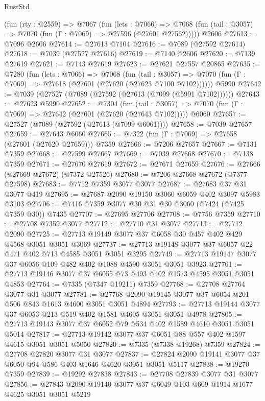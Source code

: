 \begin{lexlean}{RustStd}
\begin{coremodule}
    (fun (rty : @2559) =>
    @7067
      (fun (lets : @7066) =>
      @7068 (fun (tail : @3057) => @7070 (fun (Γ : @7069) => @27596 (@27601 @27562)))))
    @2606
@27613 := @7096 @2606
@27614 := @27613 @7104
@27616 := @7089 (@27592 @27614)
@27618 := @7039 (@27527 @27616)
@27619 := @7140 @2606
@27620 := @7139 @27619
@27621 := @7143 @27619
@27623 := @27621 @27557 @20865
@27635 := @7280
    (fun (lets : @7066) =>
    @7068
      (fun (tail : @3057) =>
      @7070 (fun (Γ : @7069) => @27618 (@27601 (@27620 (@27623 @7100 @7102))))))
    @5990
@27642 := @7039 (@27527 (@7089 (@27592 (@27613 (@7099 (@5991 @7102))))))
@27643 := @27623 @5990
@27652 := @7304
    (fun (tail : @3057) => @7070 (fun (Γ : @7069) => @27642 (@27601 (@27620 (@27643 @7102)))))
    @6060
@27657 := @27527 (@7089 (@27592 (@27613 (@7099 @6061))))
@27658 := @7039 @27657
@27659 := @27643 @6060
@27665 := @7322 (fun (Γ : @7069) => @27658 (@27601 (@27620 @27659))) @7359
@27666 := @7206 @27657
@27667 := @7131 @7359
@27668 := @27599 @27667
@27669 := @7039 @27668
@27670 := @7138 @7359
@27671 := @27670 @27619
@27672 := @27671 @27659
@27676 := @27666 (@27669 @27672) (@7372 @27526)
@27680 := @7206 @27668 @27672 (@7377 @27598)
@27683 := @7712 @7359 @3077 @3077
@27687 := @27683 @37 @31 @3077 @419
@27695 := @27687 @2090 @19150 @3060 @6059 @402 @3097 @5983 @3103
@27706 := @7416 @7359 @3077 @30 @31 @30 @3060 (@7424 (@7425 @7359 @30)) @7435
@27707 := @27695 @27706
@27708 := @7756 @7359
@27710 := @27708 @7359 @3077
@27712 := @27710 @31 @3077
@27713 := @27712 @2090
@27725 := @27713 @19149 @3077 @37 @6058 @30 @457 @402 @429 @4568 @3051 @3051 @3069
@27737 := @27713 @19148 @3077 @37 @6057 @22 @471 @402 @713 @4585 @3051 @3051 @3295
@27749 := @27713 @19147 @3077 @37 @6056 @109 @482 @402 @1088 @4590 @3051 @3051 @3923
@27761 := @27713 @19146 @3077 @37 @6055 @73 @493 @402 @1573 @4595 @3051 @3051 @4853
@27764 := @7335 (@7347 @19211) @7359
@27768 := @27708 @27764 @3077 @31 @3077
@27781 := @27768 @2090 @19145 @3077 @37 @6054 @201 @506 @843 @1613 @4600 @3051 @3051 @4894
@27793 := @27713 @19144 @3077 @37 @6053 @213 @519 @402 @1581 @4605 @3051 @3051 @4978
@27805 := @27713 @19143 @3077 @37 @6052 @79 @534 @402 @1589 @4610 @3051 @3051 @5014
@27817 := @27713 @19142 @3077 @37 @6051 @88 @557 @402 @1597 @4615 @3051 @3051 @5050
@27820 := @7335 (@7338 @19268) @7359
@27824 := @27708 @27820 @3077 @31 @3077
@27837 := @27824 @2090 @19141 @3077 @37 @6050 @94 @586 @403 @1646 @4620 @3051 @3051 @5117
@27838 := @19270 @7359
@27839 := @19292 @27838
@27843 := @27708 @27839 @3077 @31 @3077
@27856 := @27843 @2090 @19140 @3077 @37 @6049 @103 @609 @1914 @1677 @4625 @3051 @3051 @5219

\end{coremodule}
\end{lexlean}
